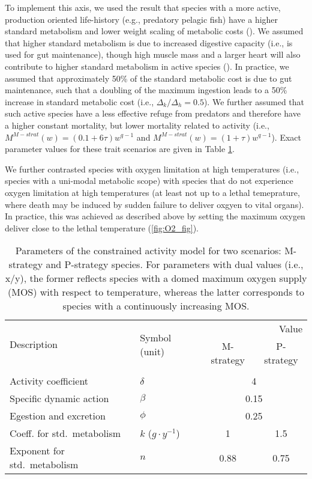 \documentclass[a4paper, toc=index,abstract=true]{scrartcl}\usepackage[]{graphicx}\usepackage[]{color}
\begin{document}
\begin{spacing}{1.9}
To implement this axis, we used the result that species with a more
active, production oriented life-history (e.g., predatory pelagic
fish) have a higher standard metabolism and lower weight scaling of
metabolic costs
(\cite{priede_metabolic_1985,killen_intraspecific_2010}). We assumed
that higher standard metabolism is due to increased digestive capacity
(i.e., is used for gut maintenance), though high muscle mass and a
larger heart will also contribute to higher standard metabolism in
active species (\cite{priede_metabolic_1985}). In practice, we assumed
that approximately 50\% of the standard metabolic cost is due to gut
maintenance, such that a doubling of the maximum ingestion leads to a
50\% increase in standard metabolic cost (i.e., $\Delta_k/\Delta_h=0.5$). We further assumed that such active species have a less effective refuge from predators and therefore have a higher constant mortality, but lower mortality related to activity (i.e., $M^{M-strat}(w) = (0.1+6\tau) w^{q-1}$ and $M^{M-strat}(w) = (1+\tau) w^{q-1}$). Exact parameter values for these trait scenarios are given in Table \ref{tab:parameters}.

We further contrasted species with oxygen limitation at high temperatures (i.e., species with a uni-modal metabolic scope) with species that do not experience oxygen limitation at high temperatures (at least not up to a lethal temeprature, where death may be induced by sudden failure to deliver oxgyen to vital organs). In practice, this was achieved as described above by setting the maximum oxygen deliver close to the lethal temperature (\ref{fig:O2_fig}).

\begin{table}
\caption{Parameters of the constrained activity model for two scenarios: M-strategy and P-strategy species. For parameters with dual values (i.e., x/y), the former reflects species with a domed maximum oxygen supply (MOS) with respect to temperature, whereas the latter corresponds to species with a continuously increasing MOS.}
\label{tab:parameters}
\begin{tabular}{llcc}
 \multirow{2}{*}{Description} &  \multirow{2}{*}{Symbol (unit)} & \multicolumn{2}{r}{Value} \\
 \cmidrule{3-4}
 & & M-strategy  & P-strategy \\

\hline
\addlinespace
\multicolumn{4}{c}{\textbf{Biomass Metabolism}} \\
Activity coefficient & $\delta$ & \multicolumn{2}{c}{4}    \\
Specific dynamic action & $\beta$ & \multicolumn{2}{c}{0.15} \\
Egestion and excretion & $\phi$ & \multicolumn{2}{c}{0.25}  \\
Coeff. for std.~metabolism  & $k$ ($g\cdot y^{-1}$)  & 1 &  1.5 \\
Exponent for std.~metabolism & $n$ & 0.88 & 0.75  \\


\end{tabular}
\end{table}
\end{spacing}
\end{document}
